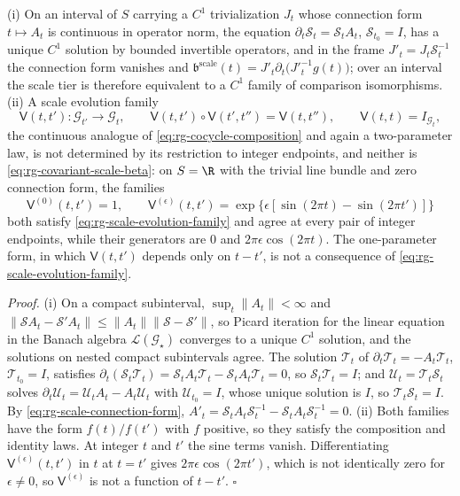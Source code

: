 (i) On an interval of \(S\) carrying a \(C^1\) trivialization \(J_t\) whose
connection form \(t\mapsto A_t\) is continuous in operator norm, the equation
\(\partial_t\mathcal S_t=\mathcal S_tA_t\), \(\mathcal S_{t_0}=I\), has a unique
\(C^1\) solution by bounded invertible operators, and in the frame
\(J'_t=J_t\mathcal S_t^{-1}\) the connection form vanishes and
\(\mathfrak b^{\mathrm{scale}}(t)=J'_t\partial_t\bigl(J'^{-1}_tg(t)\bigr)\); over
an interval the scale tier is therefore equivalent to a \(C^1\) family of
comparison isomorphisms. (ii) A scale evolution family
\begin{equation}
\mathsf V(t,t'):\mathscr G_{t'}\longrightarrow\mathscr G_t,
\qquad
\mathsf V(t,t')\circ\mathsf V(t',t'')=\mathsf V(t,t''),
\qquad
\mathsf V(t,t)=I_{\mathscr G_t},
\label{eq:rg-scale-evolution-family}
\end{equation}
the continuous analogue of \eqref{eq:rg-cocycle-composition} and again a
two-parameter law, is not determined by its restriction to integer endpoints,
and neither is \eqref{eq:rg-covariant-scale-beta}: on \(S=\R\) with the trivial
line bundle and zero connection form, the families
\begin{equation}
\mathsf V^{(0)}(t,t')=1,
\qquad
\mathsf V^{(\epsilon)}(t,t')
=\exp\bigl\{\epsilon[\sin(2\pi t)-\sin(2\pi t')]\bigr\}
\label{eq:rg-scale-interpolation-witness}
\end{equation}
both satisfy \eqref{eq:rg-scale-evolution-family} and agree at every pair of
integer endpoints, while their generators are \(0\) and
\(2\pi\epsilon\cos(2\pi t)\). The one-parameter form, in which
\(\mathsf V(t,t')\) depends only on \(t-t'\), is not a consequence of
\eqref{eq:rg-scale-evolution-family}. 

\noindent\emph{Proof.}
(i) On a compact subinterval, \(\sup_t\lVert A_t\rVert<\infty\) and
\(\lVert\mathcal SA_t-\mathcal S'A_t\rVert\leq\lVert A_t\rVert
\lVert\mathcal S-\mathcal S'\rVert\), so Picard iteration for the linear equation
in the Banach algebra \(\mathcal L(\mathcal G_\star)\) converges to a unique
\(C^1\) solution, and the solutions on nested compact subintervals agree. The
solution \(\mathcal T_t\) of \(\partial_t\mathcal T_t=-A_t\mathcal T_t\),
\(\mathcal T_{t_0}=I\), satisfies
\(\partial_t(\mathcal S_t\mathcal T_t)=\mathcal S_tA_t\mathcal T_t
-\mathcal S_tA_t\mathcal T_t=0\), so \(\mathcal S_t\mathcal T_t=I\); and
\(\mathcal U_t=\mathcal T_t\mathcal S_t\) solves
\(\partial_t\mathcal U_t=\mathcal U_tA_t-A_t\mathcal U_t\) with
\(\mathcal U_{t_0}=I\), whose unique solution is \(I\), so
\(\mathcal T_t\mathcal S_t=I\). By \eqref{eq:rg-scale-connection-form},
\(A'_t=\mathcal S_tA_t\mathcal S_t^{-1}-\mathcal S_tA_t\mathcal S_t^{-1}=0\).
(ii) Both families have the form \(f(t)/f(t')\) with \(f\) positive, so they
satisfy the composition and identity laws. At integer \(t\) and \(t'\) the sine
terms vanish. Differentiating \(\mathsf V^{(\epsilon)}(t,t')\) in \(t\) at
\(t=t'\) gives \(2\pi\epsilon\cos(2\pi t')\), which is not identically zero for
\(\epsilon\neq0\), so \(\mathsf V^{(\epsilon)}\) is not a function of \(t-t'\).
\(\square\)

